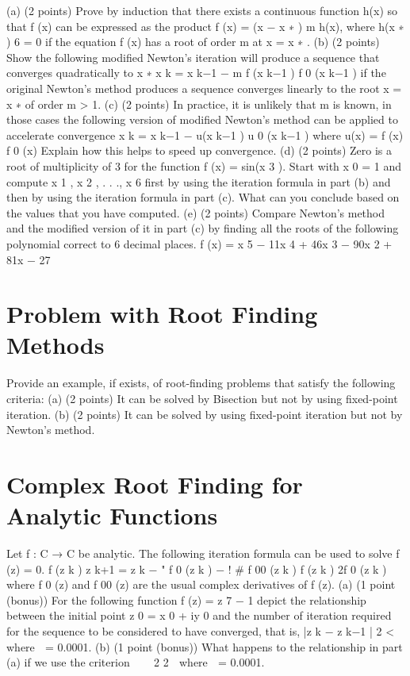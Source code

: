 (a) (2 points) Prove by induction that there exists a continuous function h(x) so that f (x)
can be expressed as the product
f (x) = (x − x ∗ ) m h(x),
where
h(x ∗ ) 6 = 0
if the equation f (x) has a root of order m at x = x ∗ .
(b) (2 points) Show the following modified Newton’s iteration will produce a sequence that
converges quadratically to x ∗
x k = x k−1 − m
f (x k−1 )
f 0 (x k−1 )
if the original Newton’s method produces a sequence converges linearly to the root
x = x ∗ of order m > 1.
(c) (2 points) In practice, it is unlikely that m is known, in those cases the following
version of modified Newton’s method can be applied to accelerate convergence
x k = x k−1 −
u(x k−1 )
u 0 (x k−1 )
where
u(x) =
f (x)
f 0 (x)
Explain how this helps to speed up convergence.
(d) (2 points) Zero is a root of multiplicity of 3 for the function
f (x) = sin(x 3 ).
Start with x 0 = 1 and compute x 1 , x 2 , . . ., x 6 first by using the iteration formula in
part (b) and then by using the iteration formula in part (c). What can you conclude
based on the values that you have computed.
(e) (2 points) Compare Newton’s method and the modified version of it in part (c) by
finding all the roots of the following polynomial correct to 6 decimal places.
f (x) = x 5 − 11x 4 + 46x 3 − 90x 2 + 81x − 27


\section{Problem with Root Finding Methods}
Provide an example, if exists, of root-finding problems that satisfy the following criteria:
(a) (2 points) It can be solved by Bisection but not by using fixed-point iteration.
(b) (2 points) It can be solved by using fixed-point iteration but not by Newton’s method.


\section{Complex Root Finding for Analytic Functions}
Let f : C → C be analytic. The following iteration formula can be used to solve f (z) = 0.
f (z k )
z k+1 = z k − "
f 0 (z k ) −
!
#
f 00 (z k )
f (z k )
2f 0 (z k )
where f 0 (z) and f 00 (z) are the usual complex derivatives of f (z).
(a) (1 point (bonus)) For the following function
f (z) = z 7 − 1
depict the relationship between the initial point z 0 = x 0 + iy 0 and the number of
iteration required for the sequence to be considered to have converged, that is,
|z k − z k−1 | 2 < 
where  = 0.0001.
(b) (1 point (bonus)) What happens to the relationship in part (a) if we use the criterion


 2
2 
where  = 0.0001.
